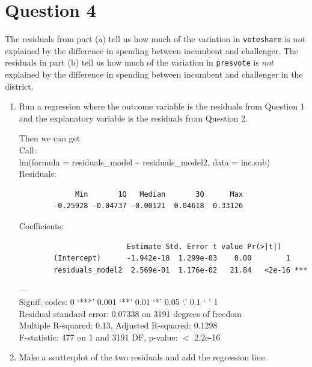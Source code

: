 \documentclass[12pt,letterpaper]{article}
\begin{document}
\section*{Question 4}
\noindent The residuals from part (a) tell us how much of the variation in \texttt{voteshare} is $not$ explained by the difference in spending between incumbent and challenger. The residuals in part (b) tell us how much of the variation in \texttt{presvote} is $not$ explained by the difference in spending between incumbent and challenger in the district.
	\begin{enumerate}
		\item Run a regression where the outcome variable is the residuals from Question 1 and the explanatory variable is the residuals from Question 2.	
		 
		
			Then we can get\\
		
		Call:\\
		lm(formula = residuals\_model \~{} residuals\_model2, data = inc.sub)\\
		
			Residuals:\\
		\begin{verbatim}
		     Min       1Q   Median       3Q      Max 
		-0.25928 -0.04737 -0.00121  0.04618  0.33126 
		\end{verbatim}
		Coefficients:\\
		\begin{verbatim}
		                 Estimate Std. Error t value Pr(>|t|)    
		(Intercept)      -1.942e-18  1.299e-03    0.00        1    
		residuals_model2  2.569e-01  1.176e-02   21.84   <2e-16 ***
		\end{verbatim}
		---\\
		Signif. codes:  0 ‘***’ 0.001 ‘**’ 0.01 ‘*’ 0.05 ‘.’ 0.1 ‘ ’ 1\\
		
		Residual standard error: 0.07338 on 3191 degrees of freedom\\
		Multiple R-squared:   0.13,	Adjusted R-squared:  0.1298 \\
		F-statistic:   477 on 1 and 3191 DF,  p-value: $<$ 2.2e-16
		\vspace{6cm}
		\item Make a scatterplot of the two residuals and add the regression line. 
			 
			\begin{figure}[H]\centering
			

\end{figure}
\end{enumerate}
\end{document}
